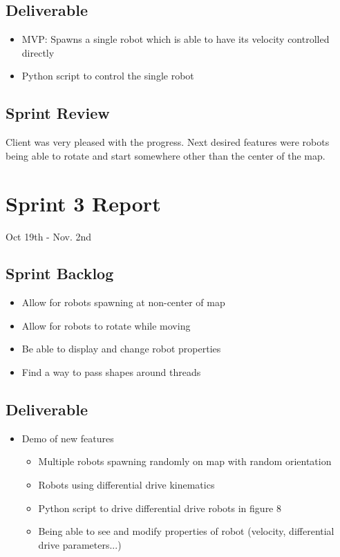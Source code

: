 \subsection{Deliverable}
\begin{itemize}
	\item MVP: Spawns a single robot which is able to have its velocity controlled directly
	\item Python script to control the single robot
\end{itemize}
\subsection{Sprint Review}
Client was very pleased with the progress. Next desired features were robots being able to rotate and start somewhere other than the center of the map.

\section{Sprint 3 Report}
Oct 19th - Nov. 2nd
\subsection{Sprint Backlog}
\begin{itemize}
	\item Allow for robots spawning at non-center of map
	\item Allow for robots to rotate while moving
	\item Be able to display and change robot properties
	\item Find a way to pass shapes around threads
\end{itemize}
\subsection{Deliverable}
\begin{itemize}
	\item Demo of new features
	\begin{itemize}
		\item Multiple robots spawning randomly on map with random orientation
		\item Robots using differential drive kinematics
		\item Python script to drive differential drive robots in figure 8
		\item Being able to see and modify properties of robot (velocity, differential drive parameters...)
	\end{itemize}
\end{itemize}
